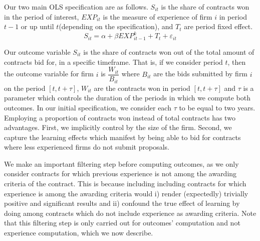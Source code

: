 Our two main OLS specification are as follows. $S_{it }$ is the share of contracts won in the period of interest, $EXP_{it} $ is the measure of experience of firm $i$ in period $t-1$ or up until $t$(depending on the specification), and $T_t$ are period fixed effect.
\begin{equation}
\label{eqn:olsspec}
S_{it}=\alpha+ \beta EXP^k_{it-1}+T_t+\varepsilon_{it}
\end{equation}



Our outcome variable $S_{it }$ is the share of contracts won out of the total amount of contracts bid for, in a specific timeframe. That is, if we consider period $t$, then the outcome variable for firm $i$ is $\dfrac{W_{it}}{B_{it}}$ where $B_{it}$ are the bids submitted by firm $i$ on the period $[t,t+\tau]$, $W_{it}$ are the contracts won in period $[t,t+\tau]$ and $\tau$ is a parameter which controls the duration of the periods in which we compute both outcomes. In our initial specification, we consider each $\tau$ to be equal to two years. Employing a proportion of contracts won instead of total contracts has two advantages. First, we implicitly control by the size of the firm. Second, we capture the learning effects which manifest by being able to bid for contracts where less experienced firms do not submit proposals.

We make an important filtering step before computing outcomes, as we only consider contracts for which previous experience is not among the awarding criteria of the contract. This is because including including contracts for which experience is among the awarding criteria would i) render (expectedly) trivially positive and significant results and ii) confound the true effect of learning by doing among contracts which do not include experience as awarding criteria. Note that this filtering step is only carried out for outcomes' computation and not experience computation, which we now describe.


